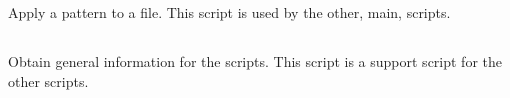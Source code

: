 
\newpage

\subsection{}
\label{UPsed}

Apply a  pattern to a file. This script is used  by the other, main,
 scripts.


\newpage

\subsection{}
\label{UPinfo}

Obtain general information for the  scripts. This script is a support
script for the other  scripts.
